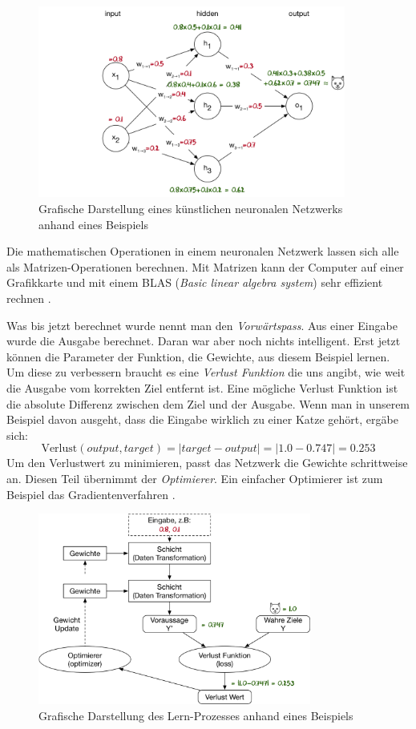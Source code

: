 \begin{figure}[hbt]
	\centering
		\includegraphics[width=0.9\textwidth]{assets/neural_net.png}
	\caption{Grafische Darstellung eines künstlichen neuronalen Netzwerks anhand eines Beispiels}
	\label{img:neuralnet}
\end{figure}

Die mathematischen Operationen in einem neuronalen Netzwerk lassen sich alle als Matrizen-Operationen berechnen. Mit Matrizen kann der Computer auf einer Grafikkarte und mit einem BLAS (\textit{Basic linear algebra system}) sehr effizient rechnen \parencite{neuronale_netze} .

Was bis jetzt berechnet wurde nennt man den \textit{Vorwärtspass}. Aus einer Eingabe wurde die Ausgabe berechnet. Daran war aber noch nichts intelligent. Erst jetzt können die Parameter der Funktion, die Gewichte, aus diesem Beispiel lernen. Um diese zu verbessern braucht es eine \textit{Verlust Funktion} die uns angibt, wie weit die Ausgabe vom korrekten Ziel entfernt ist. Eine mögliche Verlust Funktion ist die absolute Differenz zwischen dem Ziel und der Ausgabe. Wenn man in unserem Beispiel davon ausgeht, dass die Eingabe wirklich zu einer Katze gehört, ergäbe sich:
$$ \text{Verlust}(output, target) = |target-output| = |1.0-0.747| = 0.253$$
Um den Verlustwert zu minimieren, passt das Netzwerk die Gewichte schrittweise an. Diesen Teil übernimmt der  \textit{Optimierer}. Ein einfacher Optimierer ist zum Beispiel das Gradientenverfahren \parencite{gradient}.

\begin{figure}[hbt]
	\centering
		\includegraphics[width=0.8\textwidth]{assets/anatomy.png}
	\caption{Grafische Darstellung des Lern-Prozesses anhand eines Beispiels}
	\label{img:anatomy}
\end{figure}

